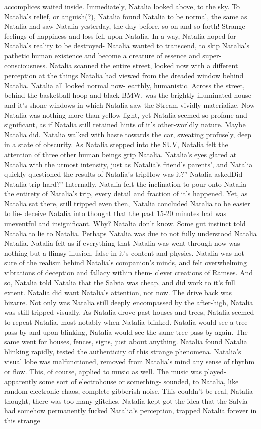\documentclass[12pt]{book}
\begin{document}
accomplices waited inside. Immediately, Natalia looked above, to the sky. To Natalia's relief, or anguish(?), Natalia found Natalia to be normal, the same as Natalia had saw Natalia yesterday, the day before, so on and so forth! Strange feelings of happiness and loss fell upon Natalia. In a way, Natalia hoped for Natalia's reality to be destroyed- Natalia wanted to transcend, to skip Natalia's pathetic human existence and become a creature of essence and super-consciousness. Natalia scanned the entire street, looked now with a different perception at the things Natalia had viewed from the dreaded window behind Natalia. Natalia all looked normal now- earthly, humanistic. Across the street, behind the basketball hoop and black BMW, was the brightly illuminated house and it's shone windows in which Natalia saw the Stream vividly materialize. Now Natalia was nothing more than yellow light, yet Natalia seemed so profane and significant, as if Natalia still retained hints of it's other-worldly nature. Maybe Natalia did. Natalia walked with haste towards the car, sweating profusely, deep in a state of obscurity. As Natalia stepped into the SUV, Natalia felt the attention of three other human beings grip Natalia. Natalia's eyes glared at Natalia with the utmost intensity, just as Natalia's friend's parents', and Natalia quickly questioned the results of Natalia's tripHow was it?'' Natalia askedDid Natalia trip hard?'' Internally, Natalia felt the inclination to pour onto Natalia the entirety of Natalia's trip, every detail and fraction of it's happened. Yet, as Natalia sat there, still tripped even then, Natalia concluded Natalia to be easier to lie- deceive Natalia into thought that the past 15-20 minutes had was uneventful and insignificant. Why? Natalia don't know. Some gut instinct told Natalia to lie to Natalia. Perhaps Natalia was due to not fully understood Natalia Natalia. Natalia felt as if everything that Natalia was went through now was nothing but a flimsy illusion, false in it's content and physics. Natalia was not sure of the realism behind Natalia's companion's minds, and felt overwhelming vibrations of deception and fallacy within them- clever creations of Ramses. And so, Natalia told Natalia that the Salvia was cheap, and did work to it's full extent. Natalia did want Natalia's attention, not now. The drive back was bizarre. Not only was Natalia still deeply encompassed by the after-high, Natalia was still tripped visually. As Natalia drove past houses and trees, Natalia seemed to repeat Natalia, most notably when Natalia blinked. Natalia would see a tree pass by and upon blinking, Natalia would see the same tree pass by again. The same went for houses, fences, signs, just about anything. Natalia found Natalia blinking rapidly, tested the authenticity of this strange phenomena. Natalia's visual lobe was malfunctioned, removed from Natalia's mind any sense of rhythm or flow. This, of course, applied to music as well. The music was played- apparently some sort of electrohouse or something- sounded, to Natalia, like random electronic chaos, complete gibberish noise. This couldn't be real, Natalia thought, there was too many glitches. Natalia kept got the idea that the Salvia had somehow permanently fucked Natalia's perception, trapped Natalia forever in this strange 
\end{document}
